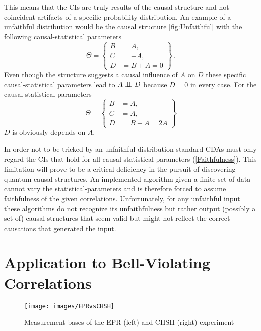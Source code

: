 This means that the \acp{CI} are truly results of the causal structure and not coincident artifacts of a specific probability distribution.
An example of a unfaithful distribution would be the causal structure \ref{fig:Unfaithful} with the following causal-statistical parameters
\begin{equation}
\Theta
=
\left\{
\begin{aligned}
B&=A,
\\
C&=-A,
\\
D&=B+A=0
\end{aligned}
\right\}
\ .
\end{equation}
Even though the structure suggests a causal influence of $A$ on $D$ these specific causal-statistical parameters lead to $A\perp\!\!\!\perp D$ because $D=0$ in every case.
For the causal-statistical parameters
\begin{equation}
\Theta
=
\left\{
\begin{aligned}
B&=A,
\\
C&=A,
\\
D&=B+A=2A
\end{aligned}
\right\}
\end{equation}
$D$ is obviously depends on $A$.

In order not to be tricked by an unfaithful distribution standard \aclp{CDA} must only regard the \acp{CI} that hold for all causal-statistical parameters (\cref{Faithfulness}).
This limitation will prove to be a critical deficiency in the pursuit of discovering quantum causal structures. 
An implemented algorithm given a finite set of data cannot vary the statistical-parameters and is therefore forced to assume faithfulness of the given correlations.
Unfortunately, for any unfaithful input these algorithms do not recognize its unfaithfulness but rather output (possibly a set of) causal structures that seem valid but might not reflect the correct causations that generated the input.

\section{Application to Bell-Violating Correlations}
\label{Basics:ApplicationtoBell-ViolatingCorrelations}

\begin{figure}[b!]
\centering
\texttt{[image: images/EPRvsCHSH]}
\caption{Measurement bases of the EPR (left) and CHSH (right) experiment}
\label{fig:EPRvsCHSH}
\end{figure}

